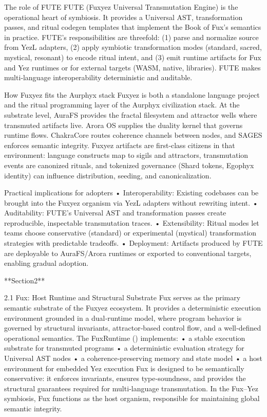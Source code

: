 The role of FUTE
FUTE (Fuxyez Universal Transmutation Engine) is the operational heart of symbiosis. It provides a Universal AST, transformation passes, and ritual codegen templates that implement the Book of Fux’s semantics in practice. FUTE’s responsibilities are threefold: (1) parse and normalize source from YezL adapters, (2) apply symbiotic transformation modes (standard, sacred, mystical, resonant) to encode ritual intent, and (3) emit runtime artifacts for Fux and Yez runtimes or for external targets (WASM, native, libraries). FUTE makes multi‑language interoperability deterministic and auditable.

How Fuxyez fits the Aurphyx stack
Fuxyez is both a standalone language project and the ritual programming layer of the Aurphyx civilization stack. At the substrate level, AuraFS provides the fractal filesystem and attractor wells where transmuted artifacts live. Arora OS supplies the duality kernel that governs runtime flows. ChakraCore routes coherence channels between nodes, and SAGES enforces semantic integrity. Fuxyez artifacts are first‑class citizens in that environment: language constructs map to sigils and attractors, transmutation events are canonized rituals, and tokenized governance (Shard tokens, Egophyx identity) can influence distribution, seeding, and canonicalization.

Practical implications for adopters
• 	Interoperability: Existing codebases can be brought into the Fuxyez organism via YezL adapters without rewriting intent.
• 	Auditability: FUTE’s Universal AST and transformation passes create reproducible, inspectable transmutation traces.
• 	Extensibility: Ritual modes let teams choose conservative (standard) or experimental (mystical) transformation strategies with predictable tradeoffs.
• 	Deployment: Artifacts produced by FUTE are deployable to AuraFS/Arora runtimes or exported to conventional targets, enabling gradual adoption.

**Section2**

2.1 Fux: Host Runtime and Structural Substrate
Fux serves as the primary semantic substrate of the Fuxyez ecosystem. It provides a deterministic execution environment grounded in a dual‑runtime model, where program behavior is governed by structural invariants, attractor‑based control flow, and a well‑defined operational semantics. The FuxRuntime () implements:
• 	a stable execution substrate for transmuted programs
• 	a deterministic evaluation strategy for Universal AST nodes
• 	a coherence‑preserving memory and state model
• 	a host environment for embedded Yez execution
Fux is designed to be semantically conservative: it enforces invariants, ensures type‑soundness, and provides the structural guarantees required for multi‑language transmutation. In the Fux–Yez symbiosis, Fux functions as the host organism, responsible for maintaining global semantic integrity.

